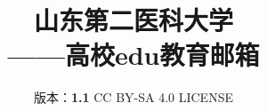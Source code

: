 

\title{%
    \normalsize
    \vspace{120pt}
    {\Huge\textbf{山东第二医科大学\\[5pt]——高校edu教育邮箱}}
}
\author{%
    版本：\textbf{1.1} \qquad%
    CC BY-SA 4.0 LICENSE \qquad%
    }
\date{\CurrentCustomTime}
\maketitle

\renewcommand{\thefootnote}{\arabic{footnote}}
